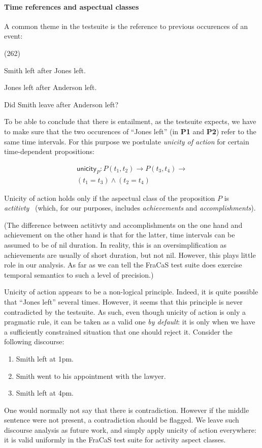 \documentclass[a4paper,11pt]{article}
\newcommand\hyp{\item[H]}
\newcommand\fracasex[2]{\begin{lingex}\item[(#1)] \begin{subex} #2 \end{subex} \end{lingex} }
\newcommand\constant[1]{\mathsf{#1}}
\begin{document}
\paragraph{Time references and aspectual classes}

A common theme in the testsuite is the reference to previous
occurences of an event:

\fracasex{262}{
\item	Smith left after Jones left.
\item	Jones left after Anderson left.
\hyp 	Did Smith leave after Anderson left?
}

To be able to conclude that there is entailment, as the testsuite expects, we have to make sure
that the two occurences of ``Jones left'' (in \textbf{P1} and \textbf{P2}) refer to the
same time intervals.
%
For this purpose we postulate \emph{unicity of action} for certain time-dependent
propositions:

\begin{multline}
  \constant{unicity}_P : P (t_1,t_2) → P (t_3,t_4) → \\ (t_1 = t_3) ∧ (t_2 = t_4)
  \label{eq:unicity}
\end{multline}

Unicity of action holds only if the aspectual class of the proposition
$P$ is \emph{actitivty}~\citep{steedman:2000} (which, for our
purposes, includes \emph{achievements} and \emph{accomplishments}).

(The difference between actitivty and accomplishments on the one hand and
achievement on the other hand is that for the latter, time intervals
can be assumed to be of nil duration. In reality, this is an
oversimplification as achievements are usually of short duration, but
not nil. However, this plays little role in our
analysis. As far as we can tell the FraCaS test suite does exercise temporal semantics to
such a level of precision.)

Unicity of action appears to be a non-logical principle. Indeed, it is
quite possible that ``Jones left'' several times. However, it seems
that this principle is never contradicted by the testsuite. As such,
even though unicity of action is only a pragmatic rule, it can be
taken as a valid one \emph{by default}: it is only when we have a
sufficiently constrained situation that one should reject it. Consider
the following discourse:
\begin{enumerate}[parsep=0pt,itemsep=1pt,label=(\arabic*)]
\item Smith left at 1pm.
\item Smith went to his appointment with the lawyer.
\item Smith left at 4pm.
\end{enumerate}
One would normally not say that there is contradiction. However if the
middle sentence were not present, a contradiction should be
flagged. We leave such discourse analysis as future work, and simply
apply unicity of action everywhere: it is valid uniformly in the
FraCaS test suite for activity aspect classes.
\end{document}

